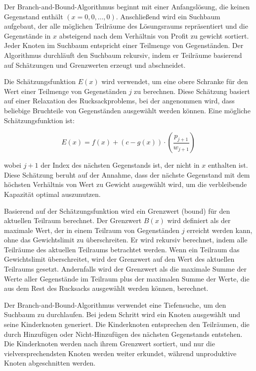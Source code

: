 Der Branch-and-Bound-Algorithmus beginnt mit einer 
Anfangslösung, die keinen Gegenstand enthält 
$(x = {0, 0, \ldots, 0})$. Anschließend wird ein Suchbaum 
aufgebaut, der alle möglichen Teilräume des Lösungsraums 
repräsentiert und die Gegenstände in $x$ absteigend nach dem Verhältnis 
von Profit zu gewicht sortiert. Jeder Knoten im Suchbaum entspricht einer 
Teilmenge von Gegenständen. Der Algorithmus durchläuft den 
Suchbaum rekursiv, indem er Teilräume basierend auf 
Schätzungen und Grenzwerten erzeugt und abschneidet.

Die Schätzungsfunktion $E(x)$ wird verwendet, um eine obere 
Schranke für den Wert einer Teilmenge von Gegenständen $j$ zu 
berechnen. Diese Schätzung basiert auf einer Relaxation des 
Rucksackproblems, bei der angenommen wird, dass beliebige 
Bruchteile von Gegenständen ausgewählt werden können. Eine 
mögliche Schätzungsfunktion ist:

\begin{equation}
    E(x) = f(x) + (c - g(x)) \cdot \left(\frac{p_{j+1}}{w_{j+1}}\right)
\end{equation}

wobei $j + 1$ der Index des nächsten Gegenstands ist, der nicht 
in $x$ enthalten ist. Diese Schätzung beruht auf der Annahme, 
dass der nächste Gegenstand mit dem höchsten Verhältnis von 
Wert zu Gewicht ausgewählt wird, um die verbleibende 
Kapazität optimal auszunutzen.

Basierend auf der Schätzungsfunktion wird ein Grenzwert 
(bound) für den aktuellen Teilraum berechnet. Der Grenzwert 
$B(x)$ wird definiert als der maximale Wert, der in einem 
Teilraum von Gegenständen $j$ erreicht werden kann, ohne das 
Gewichtslimit zu überschreiten. Er wird 
rekursiv berechnet, indem alle Teilräume des aktuellen 
Teilraums betrachtet werden. Wenn ein Teilraum das 
Gewichtslimit überschreitet, wird der Grenzwert auf den Wert 
des aktuellen Teilraums gesetzt. Andernfalls wird der 
Grenzwert als die maximale Summe der Werte aller Gegenstände 
im Teilraum plus der maximalen Summe der Werte, die aus dem 
Rest des Rucksacks ausgewählt werden können, berechnet.

Der Branch-and-Bound-Algorithmus verwendet eine Tiefensuche, 
um den Suchbaum zu durchlaufen. Bei jedem Schritt wird ein 
Knoten ausgewählt und seine Kinderknoten generiert. Die 
Kinderknoten entsprechen den Teilräumen, die durch 
Hinzufügen oder Nicht-Hinzufügen des nächsten Gegenstands 
entstehen. Die Kinderknoten werden nach ihrem Grenzwert 
sortiert, und nur die vielversprechendsten Knoten werden 
weiter erkundet, während unproduktive Knoten abgeschnitten 
werden.

